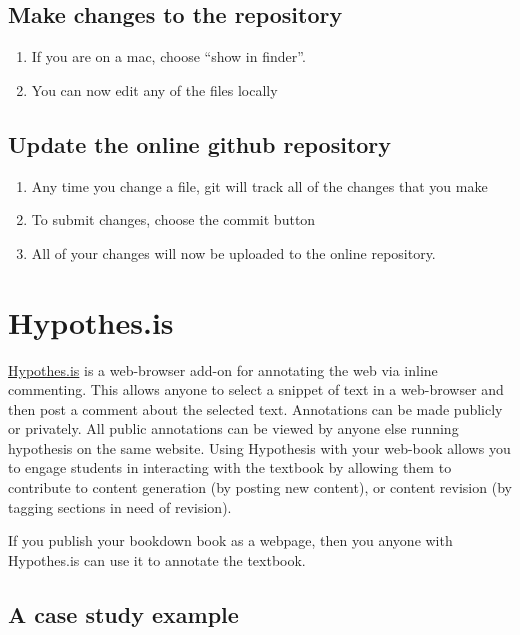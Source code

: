 \documentclass[]{book}
\providecommand{\tightlist}{%
  \setlength{\itemsep}{0pt}\setlength{\parskip}{0pt}}
\begin{document}
\section{Make changes to the
repository}\label{make-changes-to-the-repository}

\begin{enumerate}
\def\labelenumi{\arabic{enumi}.}
\tightlist
\item
  If you are on a mac, choose ``show in finder''.
\item
  You can now edit any of the files locally
\end{enumerate}

\section{Update the online github
repository}\label{update-the-online-github-repository}

\begin{enumerate}
\def\labelenumi{\arabic{enumi}.}
\tightlist
\item
  Any time you change a file, git will track all of the changes that you
  make
\item
  To submit changes, choose the commit button
\item
  All of your changes will now be uploaded to the online repository.
\end{enumerate}

\chapter{Hypothes.is}\label{hypothes.is}

\href{https://web.hypothes.is}{Hypothes.is} is a web-browser add-on for
annotating the web via inline commenting. This allows anyone to select a
snippet of text in a web-browser and then post a comment about the
selected text. Annotations can be made publicly or privately. All public
annotations can be viewed by anyone else running hypothesis on the same
website. Using Hypothesis with your web-book allows you to engage
students in interacting with the textbook by allowing them to contribute
to content generation (by posting new content), or content revision (by
tagging sections in need of revision).

If you publish your bookdown book as a webpage, then you anyone with
Hypothes.is can use it to annotate the textbook.

\section{A case study example}\label{a-case-study-example}
\end{document}

